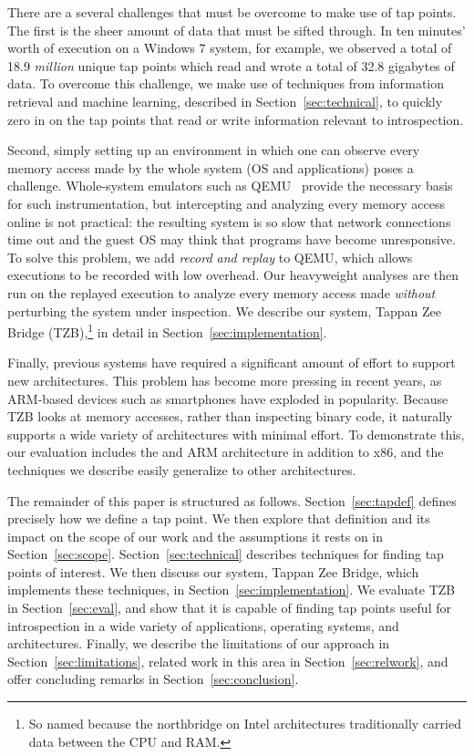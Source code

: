 There are a several challenges that must be overcome to make use of tap
points. The first is the sheer amount of data that must be sifted
through. In ten minutes' worth of execution on a Windows 7 system, for
example, we observed a total of 18.9 \emph{million} unique tap points
which read and wrote a total of 32.8 gigabytes of data. To overcome this
challenge, we make use of techniques from information retrieval and
machine learning, described in Section~\ref{sec:technical}, to quickly
zero in on the tap points that read or write information relevant to
introspection.

Second, simply setting up an environment in which one can observe every
memory access made by the whole system (OS and applications) poses a
challenge. Whole-system emulators such as QEMU~\cite{Bellard:2005}
provide the necessary basis for such instrumentation, but intercepting
and analyzing every memory access online is not practical: the resulting
system is so slow that network connections time out and the guest OS may
think that programs have become unresponsive. To solve this problem, we
add \emph{record and replay} to QEMU, which allows executions to be
recorded with low overhead. Our heavyweight analyses are then run on
the replayed execution to analyze every memory access made
\emph{without} perturbing the system under inspection. We describe our
system, Tappan Zee Bridge (TZB),\footnote{So named because the
northbridge on Intel architectures traditionally carried data between
the CPU and RAM.} in detail in Section~\ref{sec:implementation}.

Finally, previous systems have required a significant amount of effort
to support new architectures. This problem has become more pressing in
recent years, as ARM-based devices such as smartphones have exploded in
popularity. Because TZB looks at memory accesses, rather than inspecting
binary code, it naturally supports a wide variety of architectures with
minimal effort. To demonstrate this, our evaluation includes the and ARM
architecture in addition to x86, and the techniques we describe easily
generalize to other architectures.

The remainder of this paper is structured as follows.
Section~\ref{sec:tapdef} defines precisely how we define a tap point. We
then explore that definition and its impact on the scope of our work and
the assumptions it rests on in Section~\ref{sec:scope}.
Section~\ref{sec:technical} describes techniques for finding tap points
of interest. We then discuss our system, Tappan Zee Bridge, which
implements these techniques, in Section~\ref{sec:implementation}. We
evaluate TZB in Section~\ref{sec:eval}, and show that it is capable of
finding tap points useful for introspection in a wide variety of
applications, operating systems, and architectures. Finally, we describe
the limitations of our approach in Section~\ref{sec:limitations},
related work in this area in Section~\ref{sec:relwork}, and offer
concluding remarks in Section~\ref{sec:conclusion}.
